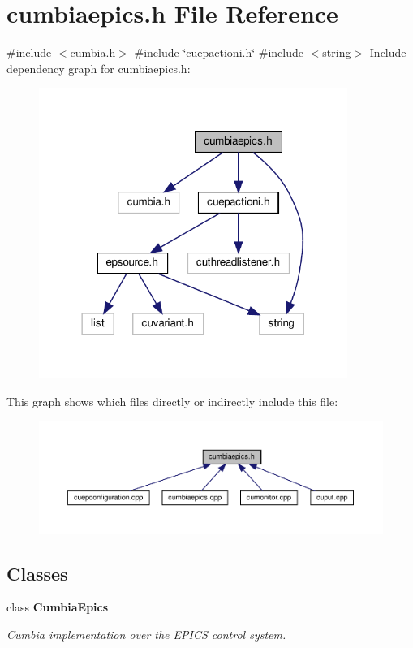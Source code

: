 \section{cumbiaepics.\+h File Reference}
\label{cumbiaepics_8h}
{\ttfamily \#include $<$cumbia.\+h$>$}\newline
{\ttfamily \#include \char`\"{}cuepactioni.\+h\char`\"{}}\newline
{\ttfamily \#include $<$string$>$}\newline
Include dependency graph for cumbiaepics.\+h\+:\nopagebreak
\begin{figure}[H]
\begin{center}
\leavevmode
\includegraphics[width=285pt]{cumbiaepics_8h__incl}
\end{center}
\end{figure}
This graph shows which files directly or indirectly include this file\+:\nopagebreak
\begin{figure}[H]
\begin{center}
\leavevmode
\includegraphics[width=350pt]{cumbiaepics_8h__dep__incl}
\end{center}
\end{figure}
\subsection*{Classes}
\begin{DoxyCompactItemize}
\item 
class \textbf{ Cumbia\+Epics}
\begin{DoxyCompactList}\small\item\em Cumbia implementation over the E\+P\+I\+CS control system. \end{DoxyCompactList}\end{DoxyCompactItemize}
